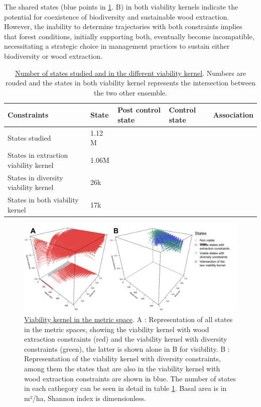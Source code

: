 \documentclass{article}
\begin{document}
The shared states (blue points in \ref{fig:Viability_kernel}. B) in both viability kernels indicate the potential for coexistence of biodiversity and sustainable wood extraction. However, the inability to determine trajectories with both constraints implies that forest conditions, initially supporting both, eventually become incompatible, necessitating a strategic choice in management practices to sustain either biodiversity or wood extraction.

\begin{table}[t!]
    \centering
    \begin{tabular}{l l l l l}
    \hline
    \hline
    \textbf{Constraints} & \textbf{State} & \textbf{Post control state} & \textbf{Control state} & \textbf{Association} \\
    \hline
    States studied & 1.12 M \\
    States in extraction viability kernel & 1.06M \\
    States in diversity viability kernel  & 26k \\
    States in both viability kernel & 17k \\
    \hline
    \hline
    \end{tabular}
    \caption{\underline{Number of states studied and in the different viability kernel}. Numbers are rouded and the states in both viability kernel represents the intersection between the two other ensemble.}
    \label{tab:Viability_kernel}
\end{table}

\begin{figure}[hb!]
    \centering
    \includegraphics[width=\textwidth]{Figure/Results/Viability_kernel.png}
    \caption{\underline{Viability kernel in the metric space}. A : Representation of all states in the metric spaces, showing the viability kernel with wood extraction constraints (red) and the viability kernel with diversity constraints (green), the latter is shown alone in B for visibility. B : Representation of the viability kernel with diversity constraints, among them the states that are also in the viability kernel with wood extraction constraints are shown in blue. The number of states in each cathegory can be seen in detail in table \ref{tab:Viability_kernel}. Basal area is in m²/ha, Shannon index is dimensionless.}
    \label{fig:Viability_kernel}
\end{figure}
\end{document}
